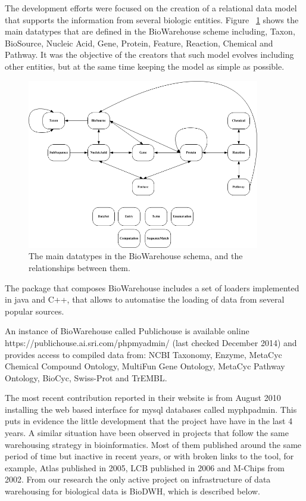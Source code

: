 The development efforts were focused on the creation of a relational data model that supports the information from several biologic entities. Figure ~\ref{fig:biowarehouse} shows the main datatypes that are defined in the BioWarehouse scheme including, Taxon, BioSource, Nucleic Acid, Gene, Protein, Feature, Reaction, Chemical and Pathway. It was the objective of the creators that such model evolves including other entities, but at the same time keeping the model as simple as possible.

\begin{figure}  
\centering
\includegraphics[width=4in]{figures/biowarehouse.png}
\caption[Original BioWarehouse schema.]{The main datatypes in the BioWarehouse schema, and the relationships between them.
\label{fig:biowarehouse}}
\end{figure}

The package that composes BioWarehouse includes a set of loaders implemented in java and C++, that allows to automatise the loading of data from several popular sources. 

An instance of BioWarehouse called Publichouse is available online https://publichouse.ai.sri.com/phpmyadmin/ (last checked December 2014) and provides access to compiled data from: NCBI Taxonomy, Enzyme, MetaCyc Chemical Compound Ontology, MultiFun Gene Ontology, MetaCyc Pathway Ontology, BioCyc, Swiss-Prot and TrEMBL.

The most recent contribution reported in their website is from August 2010 installing the web based interface for mysql databases called myphpadmin. This puts in evidence the little development that the project have have in the last 4 years. A similar situation have been observed in projects that follow the same warehousing strategy in bioinformatics. Most of them published around the same period of time but inactive in recent years, or with broken links to the tool, for example, Atlas \cite{SHA2005} published in 2005, LCB\cite{AME2006} published in 2006 and M-Chips \cite{FEL2002} from 2002. From our research the only active project on infrastructure of data warehousing for biological data is BioDWH, which is described below.

